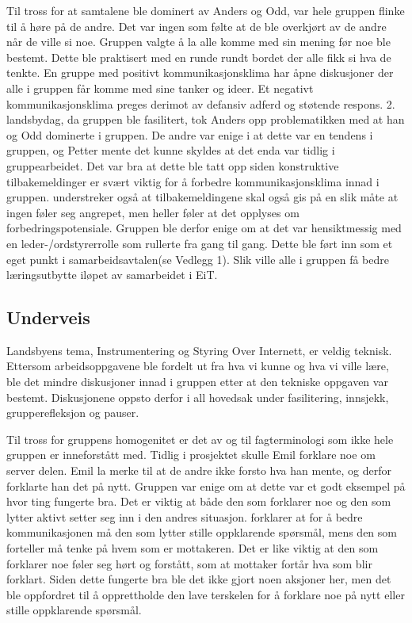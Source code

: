 Til tross for at samtalene ble dominert av Anders og Odd, var hele gruppen flinke til å høre på de andre. 
Det var ingen som følte at de ble overkjørt av de andre når de ville si noe. 
Gruppen valgte å la alle komme med sin mening før noe ble bestemt. 
Dette ble praktisert med en runde rundt bordet der alle fikk si hva de tenkte. 
En gruppe med positivt kommunikasjonsklima har åpne diskusjoner der alle i gruppen får komme med sine tanker og ideer\citep{levin}. 
Et negativt kommunikasjonsklima preges derimot av defansiv adferd og støtende respons. 
2. landsbydag, da gruppen ble fasilitert, tok Anders opp problematikken med at han og Odd dominerte i gruppen. 
De andre var enige i at dette var en tendens i gruppen, og Petter mente det kunne skyldes at det enda var tidlig i gruppearbeidet. 
Det var bra at dette ble tatt opp siden konstruktive tilbakemeldinger er svært viktig for å forbedre kommunikasjonsklima innad i gruppen.
\citet{levin} understreker også at tilbakemeldingene skal også gis på en slik måte at ingen føler seg angrepet, men heller føler at det opplyses om forbedringspotensiale.
Gruppen ble derfor enige om at det var hensiktmessig med en leder-/ordstyrerrolle som rullerte fra gang til gang.
Dette ble ført inn som et eget punkt i samarbeidsavtalen(se Vedlegg 1). 
Slik ville alle i gruppen få bedre læringsutbytte iløpet av samarbeidet i EiT. 
\vspace{\secspace}

\subsection{Underveis}
Landsbyens tema, Instrumentering og Styring Over Internett, er veldig teknisk. 
Ettersom arbeidsoppgavene ble fordelt ut fra hva vi kunne og hva vi ville lære, ble det mindre diskusjoner innad i gruppen etter at den tekniske oppgaven var bestemt. 
Diskusjonene oppsto derfor i all hovedsak under fasilitering, innsjekk, grupperefleksjon og pauser. 
\vspace{\secspace}

Til tross for gruppens homogenitet er det av og til fagterminologi som ikke hele gruppen er inneforstått med.  
Tidlig i prosjektet skulle Emil forklare noe om server delen. 
Emil la merke til at de andre ikke forsto hva han mente, og derfor forklarte han det på nytt. 
Gruppen var enige om at dette var et godt eksempel på hvor ting fungerte bra. 
Det er viktig at både den som forklarer noe og den som lytter aktivt setter seg inn i den andres situasjon.
\citet{levin} forklarer at for å bedre kommunikasjonen må den som lytter stille oppklarende spørsmål, mens den som forteller må tenke på hvem som er mottakeren. 
Det er like viktig at den som forklarer noe føler seg hørt og forstått, som at mottaker fortår hva som blir forklart. 
Siden dette fungerte bra ble det ikke gjort noen aksjoner her, men det ble oppfordret til å opprettholde den lave terskelen for å forklare noe på nytt eller stille oppklarende spørsmål.
\vspace{\secspace}

